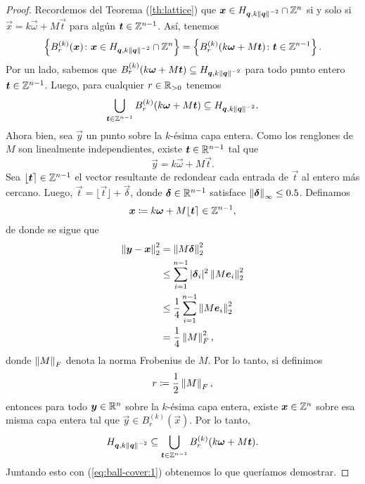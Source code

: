 \begin{proof}
	Recordemos del Teorema (\ref{th:lattice}) que $\boldsymbol{x} \in H_{\boldsymbol{q}, k\left\lVert \boldsymbol{q} \right\rVert^{-2}}
	\cap \mathbb{Z}^n$ si y solo si $\vec{x} = k\vec{\omega} + M\vec{t}$ para algún $\boldsymbol{t} \in \mathbb{Z}^{n-1}$.
	Así, tenemos
	\begin{equation*}
		\left\lbrace B_r^{(k)}(\boldsymbol{x}) \colon \boldsymbol{x} \in H_{\boldsymbol{q}, k\left\lVert \boldsymbol{q} \right\rVert^{-2}} \cap
			\mathbb{Z}^n \right\rbrace
			=
		\left\lbrace B_r^{(k)}(k\boldsymbol{\omega} + M\boldsymbol{t}) \colon \boldsymbol{t} \in \mathbb{Z}^{n-1} \right\rbrace.
	\end{equation*}
	Por un lado, sabemos que $B_r^{(k)}(k\boldsymbol{\omega} + M\boldsymbol{t}) \subseteq H_{\boldsymbol{q}, k\left\lVert \boldsymbol{q} \right\rVert^{-2}}$ para
	todo punto entero $\boldsymbol{t} \in \mathbb{Z}^{n-1}$. Luego, para cualquier $r \in \mathbb{R}_{>0}$ tenemos
	\begin{equation}
		\label{eq:ball-cover:1}
		\bigcup_{\boldsymbol{t} \in \mathbb{Z}^{n-1}}B_r^{(k)}(k\boldsymbol{\omega} + M\boldsymbol{t}) \subseteq
		H_{\boldsymbol{q}, k\left\lVert \boldsymbol{q} \right\rVert^{-2}}.
	\end{equation}
	Ahora bien, sea $\vec{y}$ un punto sobre la $k$-ésima capa entera. Como los renglones de $M$ son
	linealmente independientes, existe $\boldsymbol{t} \in \mathbb{R}^{n-1}$ tal que
	\begin{equation*}
		\vec{y} = k\vec{\omega} + M\vec{t}.
	\end{equation*}
	Sea $\lfloor \boldsymbol{t} \rceil \in \mathbb{Z}^{n-1}$ el vector resultante de redondear cada entrada de
	$\vec{t}$ al entero más cercano. Luego, $\vec{t} = \lfloor \vec{t} \rfloor + \vec{\delta}$,
	donde $\boldsymbol{\delta} \in \mathbb{R}^{n-1}$ satisface $\left\lVert \boldsymbol{\delta} \right\rVert_{\infty} \leq 0.5$. Definamos
	\begin{equation*}
		\boldsymbol{x} \coloneq k\boldsymbol{\omega} + M\lfloor \boldsymbol{t} \rceil \in \mathbb{Z}^{n-1},
	\end{equation*}
	de donde se sigue que
	\begin{align*}
		\left\lVert \boldsymbol{y} - \boldsymbol{x} \right\rVert_2^{2}
		&= \left\lVert M\boldsymbol{\delta} \right\rVert_{2}^{2} \\
		&\leq \sum_{i=1}^{n-1}|\boldsymbol{\delta}_i|^2 \left\lVert M\boldsymbol{e}_i \right\rVert_2^{2} \\
		&\leq \frac{1}{4}\sum_{i=1}^{n-1} \left\lVert M\boldsymbol{e}_i \right\rVert_2^{2} \\
		&= \frac{1}{4}\left\lVert M \right\rVert_F^2,
	\end{align*}
	donde $\left\lVert M \right\rVert_F$ denota la norma Frobenius de $M$. Por lo tanto, si definimos
	\begin{equation}
		\label{eq:radius}
		r \coloneq \frac{1}{2}\left\lVert M \right\rVert_F,
	\end{equation}
	entonces para todo $\boldsymbol{y} \in \mathbb{R}^n$ sobre la $k$-ésima capa entera, existe $\boldsymbol{x} \in \mathbb{Z}^n$
	sobre esa misma capa entera tal que $\vec{y} \in B_r^{(k)}(\vec{x})$. Por lo tanto,
	\begin{equation}
		\label{eq:ball-cover:2}
		H_{\boldsymbol{q}, k\left\lVert \boldsymbol{q} \right\rVert^{-2}} \subseteq
		\bigcup_{\boldsymbol{t} \in \mathbb{Z}^{n-1}}B_r^{(k)}(k\boldsymbol{\omega} + M\boldsymbol{t}).
	\end{equation}
	Juntando esto con (\ref{eq:ball-cover:1}) obtenemos lo que queríamos demostrar.
\end{proof}

